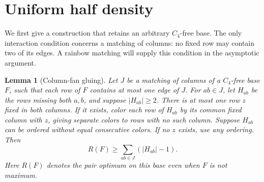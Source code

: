 \documentclass[11pt,a4paper]{article}
\newtheorem{lemma}[theorem]{Lemma}
\theoremstyle{definition}
\begin{document}
\section{Uniform half density}\label{sec:uniform-density}

We first give a construction that retains an arbitrary $C_4$-free base.
The only interaction condition concerns a matching of columns: no fixed
row may contain two of its edges. A rainbow matching will supply this
condition in the asymptotic argument.

\begin{lemma}[Column-fan gluing]\label{lem:column-fans}
Let $J$ be a matching of columns of a $C_4$-free base $F$, such that each
row of $F$ contains at most one edge of $J$. For $ab\in J$, let $H_{ab}$
be the rows missing both $a,b$, and suppose $|H_{ab}|\ge2$.
There is at most one row $z$ fixed in both columns. If it exists, color
each row of $H_{ab}$ by its common fixed column with $z$, giving separate
colors to rows with no such column. Suppose $H_{ab}$ can be ordered
without equal consecutive colors. If no $z$ exists, use any ordering.
Then
\[
 R(F)\ge\sum_{ab\in J}(|H_{ab}|-1).
\]
Here $R(F)$ denotes the pair optimum on this base even when $F$ is not maximum.
\end{lemma}
\end{document}
